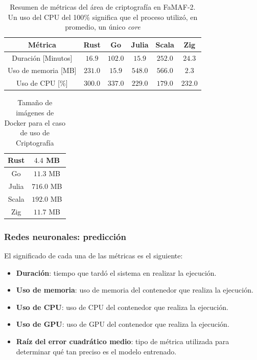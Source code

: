 \documentclass[11pt]{article}
\let\Oldsubsubsection\subsubsection
\renewcommand{\subsubsection}{\FloatBarrier\Oldsubsubsection}
\newcommand{\english}[1]{\textit{#1}}
\begin{document}
\begin{table}[H]
\centering
\begin{tabular}{|c|c|c|c|c|c|}
\hline
Métrica & Rust & Go & Julia & Scala & Zig \\ \hline
Duración [Minutos] & $16.9$ & $102.0$ & $15.9$ & $252.0$ & $24.3$ \\ \hline
Uso de memoria [MB] & $231.0$ & $15.9$ & $548.0$ & $566.0$ & $2.3$ \\ \hline
Uso de CPU [\%] & $300.0$ & $337.0$ & $229.0$ & $179.0$ & $232.0$ \\ \hline
\end{tabular}
\caption{Resumen de métricas del área de criptografía en FaMAF-2. Un uso del CPU del 100\% significa que el proceso utilizó, en promedio, un único \english{core}}
\label{tab:aes:famaf_2}
\end{table}

\begin{table}[H]
\centering
\begin{tabular}{|c|c|}
\hline
Rust & $4.4$ MB \\ \hline
Go & $11.3$ MB \\ \hline
Julia & $716.0$ MB \\ \hline
Scala & $192.0$ MB \\ \hline
Zig & $11.7$ MB \\ \hline
\end{tabular}
\caption{Tamaño de imágenes de Docker para el caso de uso de Criptografía}
\label{tab:aes:container_metrics}
\end{table}

\subsubsection{Redes neuronales: predicción} \label{sec:anex:metrics:nn}

El significado de cada una de las métricas es el siguiente:

\begin{itemize}
    \item \textbf{Duración}: tiempo que tardó el sistema en realizar la ejecución.
    \item \textbf{Uso de memoria}: uso de memoria del contenedor que realiza la ejecución.
    \item \textbf{Uso de CPU}: uso de CPU del contenedor que realiza la ejecución.
    \item \textbf{Uso de GPU}: uso de GPU del contenedor que realiza la ejecución.
    \item \textbf{Raíz del error cuadrático medio}: tipo de métrica utilizada para determinar qué tan preciso es el modelo entrenado.
\end{itemize}
\end{document}
